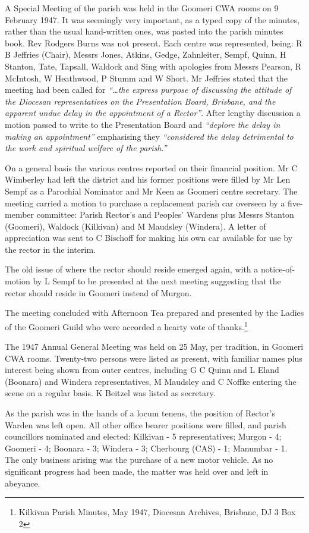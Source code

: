 A Special Meeting of the parish was held in the Goomeri CWA rooms on 9 February 1947. It was seemingly very important, as a typed copy of the minutes, rather than the usual hand-written ones, was pasted into the parish minutes book. Rev Rodgers Burns was not present. Each centre was represented, being: R B Jeffries (Chair), Messrs Jones, Atkins, Gedge, Zahnleiter, Sempf, Quinn, H Stanton, Tate, Tapsall, Waldock and Sing with apologies from Messrs Pearson, R McIntosh, W Heathwood, P Stumm and W Short. Mr Jeffries stated that the meeting had been called for \emph{``\ldots the express purpose of discussing the attitude of the Diocesan representatives on the Presentation Board, Brisbane, and the apparent undue delay in the appointment of a Rector''}. After lengthy discussion a motion passed to write to the Presentation Board and \emph{``deplore the delay in making an appointment''} emphasising they \emph{``considered the delay detrimental to the work and spiritual welfare of the parish.''}

On a general basis the various centres reported on their financial position. Mr C Wimberley had left the district and his former positions were filled by Mr Len Sempf as a Parochial Nominator and Mr Keen as Goomeri centre secretary. The meeting carried a motion to purchase a replacement parish car overseen by a five-member committee: Parish Rector's and Peoples' Wardens plus Messrs Stanton (Goomeri), Waldock (Kilkivan) and M Maudsley (Windera). A letter of appreciation was sent to C Bischoff for making his own car available for use by the rector in the interim.

The old issue of where the rector should reside emerged again, with a notice-of-motion by L Sempf to be presented at the next meeting suggesting that the rector should reside in Goomeri instead of Murgon.

The meeting concluded with Afternoon Tea prepared and presented by the Ladies of the Goomeri Guild who were accorded a hearty vote of thanks.\footnote{Kilkivan Parish Minutes, May 1947, Diocesan Archives, Brisbane, DJ 3 Box 2}

The 1947 Annual General Meeting was held on 25 May, per tradition, in Goomeri CWA rooms. Twenty-two persons were listed as present, with familiar names plus interest being shown from outer centres, including G C Quinn and L Eland (Boonara) and Windera representatives, M Maudsley and C Noffke entering the scene on a regular basis. K Beitzel was listed as secretary.

As the parish was in the hands of a locum tenens, the position of Rector's Warden was left open. All other office bearer positions were filled, and parish councillors nominated and elected: Kilkivan - 5 representatives; Murgon - 4; Goomeri - 4; Boonara - 3; Windera - 3; Cherbourg (CAS) - 1; Manumbar - 1. The only business arising was the purchase of a new motor vehicle. As no significant progress had been made, the matter was held over and left in abeyance.

